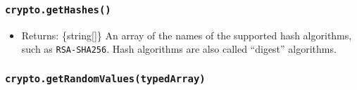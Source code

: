 \subsubsection{\texorpdfstring{\texttt{crypto.getHashes()}}{crypto.getHashes()}}\label{crypto.gethashes}

\begin{itemize}
\tightlist
\item
  Returns: \{string{[}{]}\} An array of the names of the supported hash
  algorithms, such as
  \texttt{\textquotesingle{}RSA-SHA256\textquotesingle{}}. Hash
  algorithms are also called ``digest'' algorithms.
\end{itemize}

\begin{Shaded}
\begin{Highlighting}[]
\NormalTok{ \{}
\OperatorTok{,}
\NormalTok{\} }\OperatorTok{=}  \NormalTok{(}\NormalTok{)}\OperatorTok{;}

\NormalTok{(}\NormalTok{())}\OperatorTok{;} 
\end{Highlighting}
\end{Shaded}

\begin{Shaded}
\begin{Highlighting}[]
\NormalTok{ \{}
\OperatorTok{,}
\NormalTok{\} }\OperatorTok{=} \NormalTok{(}\NormalTok{)}\OperatorTok{;}

\NormalTok{(}\NormalTok{())}\OperatorTok{;} 
\end{Highlighting}
\end{Shaded}

\subsubsection{\texorpdfstring{\texttt{crypto.getRandomValues(typedArray)}}{crypto.getRandomValues(typedArray)}}\label{crypto.getrandomvaluestypedarray}

